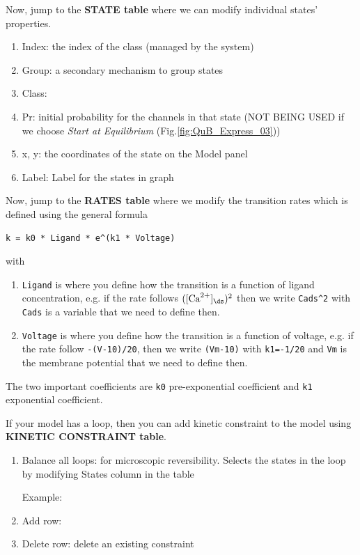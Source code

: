 Now, jump to the {\bf STATE table} where we can modify individual states'
properties. 
\begin{enumerate}
  \item Index: the index of the class (managed by the system)
  \item Group: a secondary mechanism to group states
  \item Class:
  \item Pr: initial probability for the channels in that state (NOT BEING USED
  if we choose {\it Start at Equilibrium} (Fig.\ref{fig:QuB_Express_03}))
  \item x, y: the coordinates of the state on the Model panel 
  \item Label: Label for the states in graph
\end{enumerate}

Now, jump to the {\bf RATES table} where we modify the transition rates which is
defined using the general formula
\begin{verbatim}
k = k0 * Ligand * e^(k1 * Voltage)
\end{verbatim}
with 
\begin{enumerate}
  \item \verb!Ligand! is where you define how the transition is a function of
ligand concentration, e.g. if the rate follows $([\Ca]_\ds)^2$ then we write 
\verb!Cads^2! with \verb!Cads! is a variable that we need to define then.
  \item \verb!Voltage! is where you define how the transition is a function of
  voltage, e.g. if the rate follow \verb!-(V-10)/20!, then we write
  \verb!(Vm-10)! with \verb!k1=-1/20! and \verb!Vm! is the membrane potential
  that we need to define then.
\end{enumerate}
The two important coefficients are \verb!k0! pre-exponential coefficient and
\verb!k1! exponential coefficient.

If your model has a loop, then you can add kinetic constraint to the model using
{\bf KINETIC CONSTRAINT table}. 
\begin{enumerate}
  \item Balance all loops: for microscopic reversibility. Selects the states in
  the loop by modifying States column in the table

Example: 
  \item Add row: 
  \item Delete row: delete an existing constraint
\end{enumerate}

